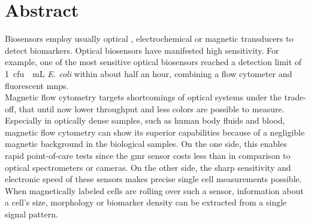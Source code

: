 
\chapter{Abstract}
Biosensors employ usually optical \cite{lit:bio:BioconjugateTechniques}, electrochemical \cite{lit:fluidic:BindingPhysicsSurfaces} or magnetic \cite{lit:thes:reisbeck, lit:bio:MRCyte2016, lit:bio:NanoCytometer} transducers to detect biomarkers.  Optical  biosensors  have  manifested  high  sensitivity.\cite{lit:Shapiro}  For example, one of the  most  sensitive  optical  biosensors reached a detection limit of \SI{1}{cfu \per\milli\liter} \textit{E. coli} within about half an hour,  combining  a  flow  cytometer  and  fluorescent  \glspl{mnp}.\cite{lit:flowCytometer} \\
Magnetic flow cytometry targets shortcomings of optical systems under the trade-off, that until now lower throughput and less colors are possible to measure.\cite{lit:thes:reisbeck} Especially in optically dense samples, such as human body fluids and blood, magnetic flow cytometry can show its superior capabilities because of a negligible magnetic background in the biological samples. On the one side, this enables rapid point-of-care tests since the \gls{gmr} sensor costs less than  in comparison to optical spectrometers or cameras.\cite{lit:fluidic:HighFlowGMR,lit:bio:aflatoxinMNP,lit:bio:POC_CD64} On the other side, the sharp sensitivity and electronic speed of these sensors makes precise single cell measurements possible.\cite{lit:bio:MRCyte2016,lit:fluidic:GMR_Quantification, lit:paperHelou} When magnetically labeled cells are rolling over such a sensor, information about a cell's size, morphology or biomarker density can be extracted from a single signal pattern.\cite{lit:thes:michaelBauer} 

